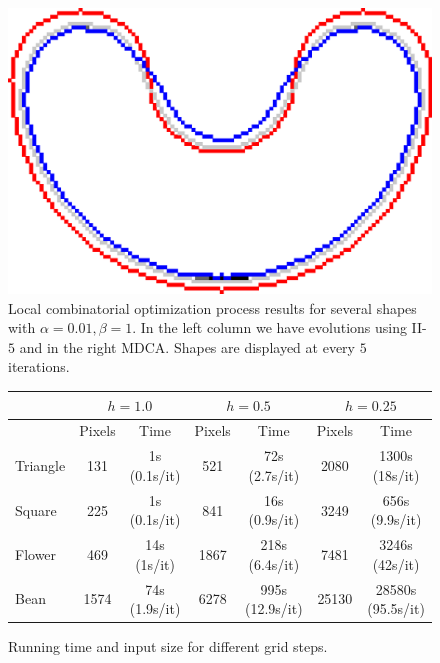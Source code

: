 \begin{figure}[!h]
\begin{minipage}[b]{0.5\textwidth}
	\includegraphics[scale=0.25]{figures/chapter5/exhaustive-selection/mdca-lp0.01/bean/summary.pdf}
\end{minipage}%
		\caption{Local combinatorial optimization process results for several shapes with $\alpha=0.01,\beta=1$. In the left column we have evolutions using II-$5$ and in the right MDCA. Shapes are displayed at every $5$ iterations.}	
		\label{fig:local-comb-square-results}
\end{figure}


\begin{figure}[h!]
\center
\captionsetup{type=table}
\begin{tabular}{|l|c|c|c|c|c|c|}
\hline
& \multicolumn{2}{c|}{$h=1.0$} & \multicolumn{2}{c|}{$h=0.5$} & \multicolumn{2}{c|}{$h=0.25$}\\
\hline
& Pixels & Time & Pixels & Time & Pixels & Time\\
\hline
Triangle & 131 & 1s (0.1s/it)  & 521 & 72s (2.7s/it) & 2080 & 1300s (18s/it)\\
Square & 225 & 1s (0.1s/it) & 841 & 16s (0.9s/it) & 3249 & 656s (9.9s/it)\\
Flower & 469 & 14s (1s/it) & 1867 & 218s (6.4s/it) & 7481 & 3246s (42s/it)\\
Bean  & 1574 & 74s (1.9s/it) & 6278 & 995s (12.9s/it) & 25130 & 28580s (95.5s/it)\\
\hline
\end{tabular}
\caption{Running time and input size for different grid steps.}
\label{tab:summary-local-comb-rtime} 
\end{figure}







